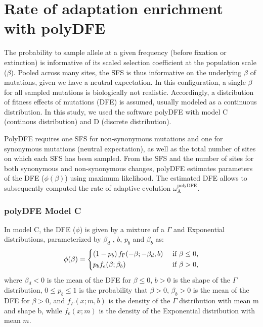 \documentclass{article}
\newcommand{\rateApop}{\omega_{\mathrm{A}}}
\newcommand{\Spop}{\beta}
\begin{document}
    \pagebreak

    \section{Rate of adaptation enrichment with polyDFE}
    \label{sec:polyDFE}

    The probability to sample allele at a given frequency (before fixation or extinction) is informative of its scaled selection coefficient at the population scale ($\Spop$).
    Pooled across many sites, the SFS is thus informative on the underlying $\Spop$ of mutations, given we have a neutral expectation.
    In this configuration, a single $\Spop$ for all sampled mutations is biologically not realistic.
    Accordingly, a distribution of fitness effects of mutations (DFE) is assumed, usually modeled as a continuous distribution\cite{eyre-walker_distribution_2006, eyre-walker_estimating_2009}.
    In this study, we used the software polyDFE\cite{tataru_inference_2017, tataru_polydfe_2020} with model C (continous distribution) and D (discrete distribution).

    PolyDFE requires one SFS for non-synonymous mutations and one for synonymous mutations (neutral expectation), as well as the total number of sites on which each SFS has been sampled.
    From the SFS and the number of sites for both synonymous and non-synonymous changes, polyDFE estimates parameters of the DFE ($\phi (\Spop)$) using maximum likelihood.
    The estimated DFE allows to subsequently computed the rate of adaptive evolution $\rateApop^{\mathrm{polyDFE}}$.

    \subsubsection*{polyDFE Model C}
    In model C, the DFE ($\phi$) is given by a mixture of a $\Gamma$ and Exponential distributions, parameterized by $\Spop_d$ , $b$, $p_b$
    and $\Spop_b$ as:
    \begin{equation*}
        \phi (\Spop) =
        \begin{dcases}
            \left( 1 - p_b \right) f_{\Gamma}(-\Spop; -\Spop_d, b) & \text{ if $\Spop \leq 0$,} \\
            p_b f_{e}(\Spop; \Spop_b) & \text{ if $\Spop > 0$,} \\
        \end{dcases}
    \end{equation*}
    where $\Spop_d < 0 $ is the mean of the DFE for $\Spop \leq 0$,
    $b > 0$ is the shape of the $\Gamma$ distribution,
    $0 \leq p_b \leq 1$ is the probability that $\Spop > 0$,
    $\Spop_b > 0$ is the mean of the DFE for $\Spop > 0$,
    and $f_{\Gamma}(x; m, b)$ is the density of the $\Gamma$ distribution with mean m and shape b, while $f_{e}(x; m)$ is the density of the Exponential distribution with mean $m$.
\end{document}
